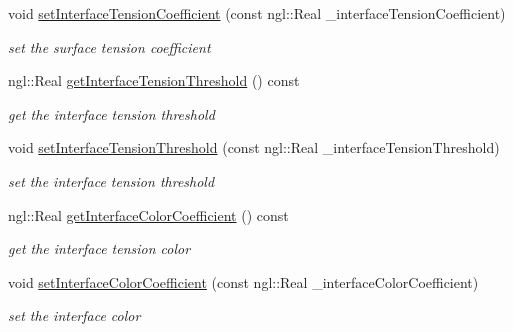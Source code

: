 \begin{DoxyCompactItemize}
void \hyperlink{class_fluid_particle_a00b8eca62e076dcd2d8dff6ad6619ead}{setInterfaceTensionCoefficient} (const ngl::Real \_\-interfaceTensionCoefficient)
\begin{DoxyCompactList}\small\item\em set the surface tension coefficient \item\end{DoxyCompactList}\item 
ngl::Real \hyperlink{class_fluid_particle_a95997fec4d4cc300fc327e4688ba3e40}{getInterfaceTensionThreshold} () const 
\begin{DoxyCompactList}\small\item\em get the interface tension threshold \item\end{DoxyCompactList}\item 
void \hyperlink{class_fluid_particle_a9cf3c861484e2487e56e68b509d67dd5}{setInterfaceTensionThreshold} (const ngl::Real \_\-interfaceTensionThreshold)
\begin{DoxyCompactList}\small\item\em set the interface tension threshold \item\end{DoxyCompactList}\item 
ngl::Real \hyperlink{class_fluid_particle_ab5fe54946c3926616b694fc8aee28fc8}{getInterfaceColorCoefficient} () const 
\begin{DoxyCompactList}\small\item\em get the interface tension color \item\end{DoxyCompactList}\item 
void \hyperlink{class_fluid_particle_a24edd2572ede213fba7dad12a9710ad0}{setInterfaceColorCoefficient} (const ngl::Real \_\-interfaceColorCoefficient)
\begin{DoxyCompactList}\small\item\em set the interface color \item\end{DoxyCompactList}\end{DoxyCompactItemize}
